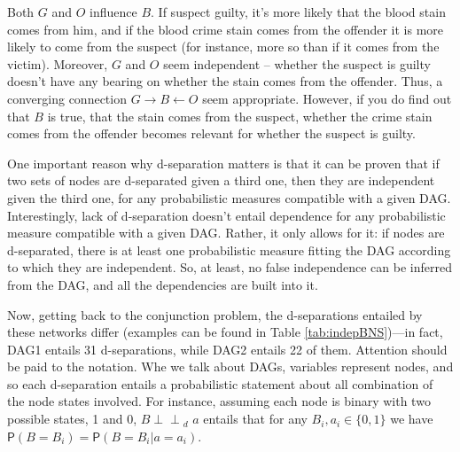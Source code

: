 \documentclass[
  10pt,
  dvipsnames,enabledeprecatedfontcommands]{scrartcl}
\newcommand{\indep}{\!\perp \!\!\! \perp\!}
\newcommand{\pr}[1]{\ensuremath{\mathsf{P}(#1)}}
\begin{document}
\noindent Both \(G\) and \(O\) influence \(B\). If suspect guilty, it's
more likely that the blood stain comes from him, and if the blood crime
stain comes from the offender it is more likely to come from the suspect
(for instance, more so than if it comes from the victim). Moreover,
\(G\) and \(O\) seem independent -- whether the suspect is guilty
doesn't have any bearing on whether the stain comes from the offender.
Thus, a converging connection \(G\rightarrow B \leftarrow O\) seem
appropriate. However, if you do find out that \(B\) is true, that the
stain comes from the suspect, whether the crime stain comes from the
offender becomes relevant for whether the suspect is guilty.

One important reason why d-separation matters is that it can be proven
that if two sets of nodes are d-separated given a third one, then they
are independent given the third one, for any probabilistic measures
compatible with a given DAG. Interestingly, lack of d-separation doesn't
entail dependence for any probabilistic measure compatible with a given
DAG. Rather, it only allows for it: if nodes are d-separated, there is
at least one probabilistic measure fitting the DAG according to which
they are independent. So, at least, no false independence can be
inferred from the DAG, and all the dependencies are built into it.

Now, getting back to the conjunction problem, the d-separations entailed
by these networks differ (examples can be found in Table
\ref{tab:indepBNS})---in fact, \textsf{DAG1} entails 31 d-separations,
while \textsf{DAG2} entails 22 of them. Attention should be paid to the
notation. Whe we talk about DAGs, variables represent nodes, and so each
d-separation entails a probabilistic statement about all combination of
the node states involved. For instance, assuming each node is binary
with two possible states, 1 and 0, \mbox{$B   \indep_d\,\,  a $} entails
that for any \mbox{$ B_i, a_i \in \{0, 1\}$} we have
\(\pr{B = B_i} = \pr{B = B_i \vert a = a_i}\).
\end{document}
